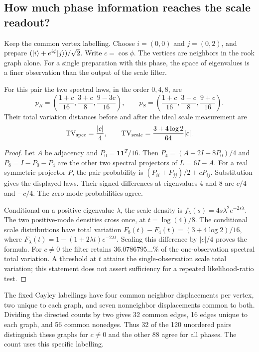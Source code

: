 \documentclass[11pt,letterpaper]{article}
\begin{document}
\subsection*{How much phase information reaches the scale readout?}
Keep the common vertex labelling. Choose $i=(0,0)$ and $j=(0,2)$, and prepare $(\lvert i\rangle+e^{i\phi}\lvert j\rangle)/\sqrt2$. Write $c=\cos\phi$. The vertices are neighbors in the rook graph alone. For a single preparation with this phase, the space of eigenvalues is a finer observation than the output of the scale filter.

\begin{proposition}
For this pair the two spectral laws, in the order $0,4,8$, are
\[
 p_R=\left(\frac{1+c}{16},\frac{3+c}{8},\frac{9-3c}{16}\right),\qquad
 p_S=\left(\frac{1+c}{16},\frac{3-c}{8},\frac{9+c}{16}\right).
\]
Their total variation distances before and after the ideal scale measurement are
\[
 \operatorname{TV}_{\rm spec}=\frac{|c|}{4},\qquad
 \operatorname{TV}_{\rm scale}=\frac{3+4\log 2}{64}|c|.
\]
\end{proposition}
\begin{proof}
Let $A$ be adjacency and $P_0=\mathbf1\mathbf1^T/16$. Then $P_4=(A+2I-8P_0)/4$ and $P_8=I-P_0-P_4$ are the other two spectral projectors of $L=6I-A$. For a real symmetric projector $P$, the pair probability is $(P_{ii}+P_{jj})/2+cP_{ij}$. Substitution gives the displayed laws. Their signed differences at eigenvalues 4 and 8 are $c/4$ and $-c/4$. The zero-mode probabilities agree.

Conditional on a positive eigenvalue $\lambda$, the scale density is $f_\lambda(s)=4s\lambda^2e^{-2s\lambda}$. The two positive-mode densities cross once, at $t=\log(4)/8$. The conditional scale distributions have total variation $F_8(t)-F_4(t)=(3+4\log 2)/16$, where $F_\lambda(t)=1-(1+2\lambda t)e^{-2\lambda t}$. Scaling this difference by $|c|/4$ proves the formula. For $c\ne0$ the filter retains $36.0786795\ldots\%$ of the one-observation spectral total variation. A threshold at $t$ attains the single-observation scale total variation; this statement does not assert sufficiency for a repeated likelihood-ratio test.
\end{proof}

The fixed Cayley labellings have four common neighbor displacements per vertex, two unique to each graph, and seven nonneighbor displacements common to both. Dividing the directed counts by two gives 32 common edges, 16 edges unique to each graph, and 56 common nonedges. Thus 32 of the 120 unordered pairs distinguish these graphs for $c\ne0$ and the other 88 agree for all phases. The count uses this specific labelling.
\end{document}
